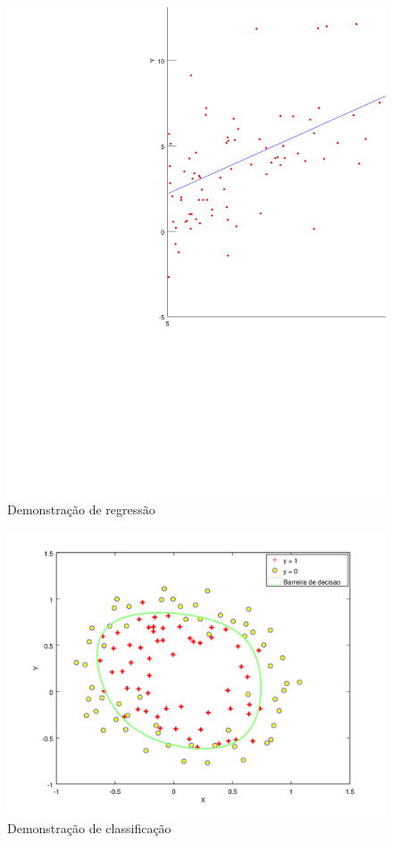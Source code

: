 \begin{figure}[htb]
	  \caption{Demonstração de regressão}\label{fig:demregressao}
	  \begin{center}
	      \includegraphics[scale=0.6]{img/regressao2}
	  \end{center}
\end{figure}

\begin{figure}[htb]
  \caption{Demonstração de classificação}\label{fig:demclassificacao}
  \begin{center}
      \includegraphics[scale=0.6]{img/classificacao2}
  \end{center}
\end{figure}


